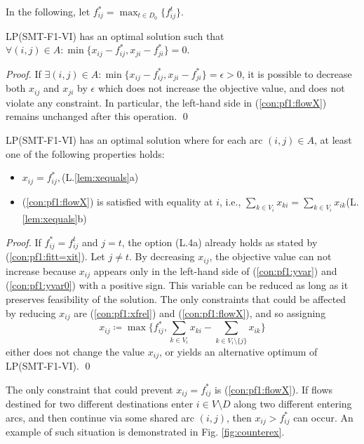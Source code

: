 In the following, let $f^*_{ij}=\max_{t\in D_0}\{f^t_{ij}\}$.
\begin{lemma}\label{lem:oneslack} LP(SMT-F1-VI) has an optimal solution such that \newline
$\forall (i,j)\in A: \min\{x_{ij} - f^*_{ij}, x_{ji}-f^*_{ji}\}=0$.
\end{lemma}
\begin{proof}
If $\exists (i,j)\in A: \min\{x_{ij} - f^*_{ij}, x_{ji}-f^*_{ji}\}=\epsilon>0$, it is possible to decrease both $x_{ij}$ and $x_{ji}$ by $\epsilon$ which does not increase the objective value, and does not violate any constraint.
In particular, the left-hand side in (\ref{con:pf1:flowX}) remains unchanged after this operation.
\qed
\end{proof}
\begin{lemma}\label{lem:xequals} LP(SMT-F1-VI) has an optimal solution where for each arc $(i,j)\in A$, at least one of the following properties holds:
\begin{itemize}
\item\label{lem:item:noslack} $x_{ij}=f^*_{ij},$\hfill(L.\ref{lem:xequals}a)
\item\label{lem:item:slack} (\ref{con:pf1:flowX}) is satisfied with equality at $i$, i.e., $\sum_{k\in V_{i}}x_{ki}=\sum_{k\in V_i}x_{ik}$\hfill(L.\ref{lem:xequals}b)
\end{itemize}
\end{lemma}
\begin{proof}
If $f^*_{ij}=f^t_{ij}$ and $j=t$, the option (L.4a) already holds as stated by (\ref{con:pf1:fitt=xit}).
Let $j\neq t$.
By decreasing $x_{ij}$, the objective value can not increase because $x_{ij}$ appears only in the left-hand side of (\ref{con:pf1:yvar}) and (\ref{con:pf1:yvar0}) with a positive sign.
This variable can be reduced as long as it preserves feasibility of the solution.
The only constraints that could be affected by reducing $x_{ij}$ are (\ref{con:pf1:xfrel}) and (\ref{con:pf1:flowX}), and so assigning 
%
$$x_{ij}\coloneqq\max\bigg\{ f^*_{ij},\sum_{k\in V_i}x_{ki}-\sum_{k\in V_i\setminus\{j\}}x_{ik}\bigg\}$$
%
either does not change the value $x_{ij}$, or yields an alternative optimum of LP(SMT-F1-VI). \qed
\end{proof}
The only constraint that could prevent $x_{ij}=f^*_{ij}$ is (\ref{con:pf1:flowX}).
If flows destined for two different destinations enter $i\in V\setminus D$ along two different entering arcs, and then continue via some shared arc $(i,j)$, then $x_{ij}>f^*_{ij}$ can occur.
An example of such situation is demonstrated in Fig. \ref{fig:counterex}.

